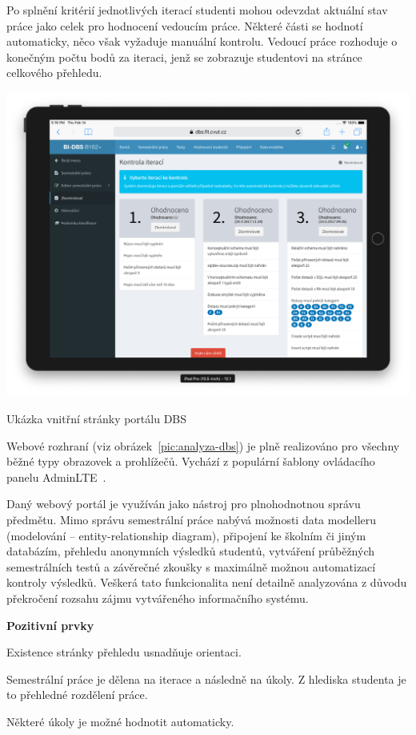 Po splnění kritérií jednotlivých iterací studenti mohou odevzdat aktuální stav práce jako celek pro hodnocení vedoucím práce. Některé části se hodnotí automaticky, něco však vyžaduje manuální kontrolu. Vedoucí práce rozhoduje o konečným počtu bodů za iteraci, jenž se zobrazuje studentovi na stránce celkového přehledu.

\begin{fig:illustration}
   \includegraphics[width=1\textwidth]{images/analyza-dbs.png}
   \caption{Ukázka vnitřní stránky portálu DBS}\label{pic:analyza-dbs}
\end{fig:illustration}


Webové rozhraní (viz obrázek~\ref{pic:analyza-dbs}) je plně realizováno pro všechny běžné typy obrazovek a prohlížečů. Vychází z populární šablony ovládacího panelu AdminLTE~\cite{adminLTE}.

Daný webový portál je využíván jako nástroj pro plnohodnotnou správu předmětu. Mimo správu semestrální práce nabývá možnosti data modelleru (modelování  -- entity-relationship diagram), připojení ke školním či jiným databázím, přehledu anonymních výsledků studentů, vytváření průběžných semestrálních testů a závěrečné zkoušky s maximálně možnou automatizací kontroly výsledků. Veškerá tato funkcionalita není detailně analyzována z důvodu překročení rozsahu zájmu vytvářeného informačního systému.

\newpage
\textbf{Pozitivní prvky}
\begin{ul}
   \item Existence stránky přehledu usnadňuje orientaci.
   \item Semestrální práce je dělena na iterace a následně na úkoly. Z hlediska studenta je to přehledné rozdělení práce.
   \item Některé úkoly je možné hodnotit automaticky.
\end{ul}

